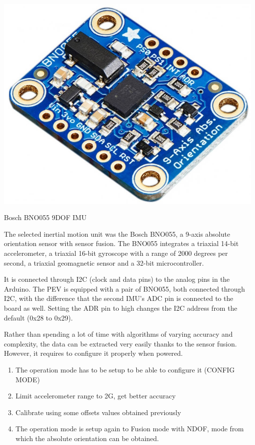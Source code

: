 \begin{marginfigure}[1cm]
	\includegraphics[width=1\linewidth]{figs/05/bno055}
	\caption{Bosch BNO055 9DOF IMU}
\end{marginfigure}
The selected inertial motion unit was the Bosch BNO055, a 9-axis absolute orientation sensor with sensor fusion. The BNO055 integrates a triaxial 14-bit accelerometer, a triaxial 16-bit gyroscope with a range of 2000 degrees per second, a triaxial geomagnetic sensor and a 32-bit microcontroller.

It is connected through I2C (clock and data pins) to the analog pins in the Arduino. The PEV is equipped with a pair of BNO055, both connected through I2C, with the difference that the second IMU's ADC pin is connected to the board as well. Setting the ADR pin to high changes the I2C address from the default (0x28 to 0x29).


Rather than spending a lot of time with algorithms of varying accuracy and complexity, the data can be extracted very easily thanks to the sensor fusion. However, it requires to configure it properly when powered. 
\begin{enumerate}\itemsep -10pt
\item The operation mode has to be setup to be able to configure it (CONFIG MODE)
\item Limit accelerometer range to 2G, get better accuracy
\item Calibrate using some offsets values obtained previously
\item The operation mode is setup again to Fusion mode with NDOF, mode from which the absolute orientation can be obtained.
\end{enumerate}

